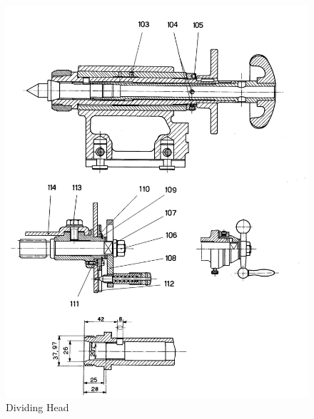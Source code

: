 \newpage
\begin{figure}[h]
    \centering
    \includegraphics[width=1.0\linewidth]{./images/page_47}
    \caption{Dividing Head}
    \label{fig:dividing_head_2}
\end{figure}
